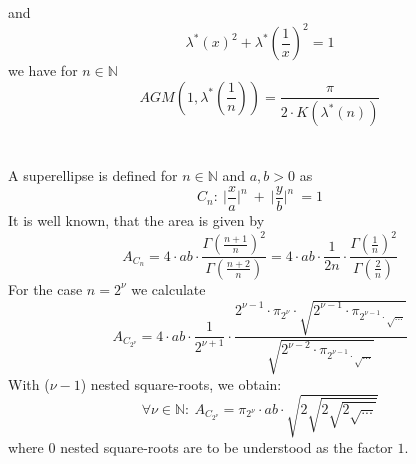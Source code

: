 \documentclass[sn-mathphys]{sn-jnl}%
\theoremstyle{thmstyleone}%
\theoremstyle{thmstyletwo}%
\theoremstyle{thmstylethree}%
\begin{document}
and 
\begin{equation*}
\lambda^{*}(x)^2 + \lambda^{*}(\frac{1}{x})^2 = 1
\end{equation*}
we have for $n \in \mathbb{N}$
\begin{equation}
AGM(1, \lambda^{*}(\frac{1}{n})) = \frac{\pi}{2 \cdot K(\lambda^{*}(n))}
\end{equation}
\\ \\
A superellipse is defined for $n \in \mathbb{N}$ and $a,b > 0$ as
\begin{equation}
C_n : \ \lvert \frac{x}{a} \lvert^{n} \ + \ \lvert \frac{y}{b} \lvert^{n} \ = 1
\end{equation}
It is well known, that the area is given by
\begin{equation}
A_{C_{n}} = 4 \cdot ab \cdot \frac{\Gamma(\frac{n+1}{n})^2}{\Gamma(\frac{n+2}{n})} = 4 \cdot ab \cdot \frac{1}{2n} \cdot \frac{\Gamma(\frac{1}{n})^2}{\Gamma(\frac{2}{n})}
\end{equation}
For the case $n = 2^{\nu}$ we calculate
\begin{equation*}
A_{C_{2^{\nu}}} = 4 \cdot ab \cdot \frac{1}{2^{\nu + 1}} \cdot \frac{2^{\nu - 1} \cdot \pi_{2^{\nu}} \cdot \sqrt{2^{\nu - 1} \cdot \pi_{2^{\nu - 1} \cdot \sqrt{...}}}}{\sqrt{2^{\nu - 2} \cdot \pi_{2^{\nu - 1} \cdot \sqrt{...}}}}
\end{equation*}
With ($\nu - 1$) nested square-roots, we obtain: \\
\begin{equation}
\forall \nu \in \mathbb{N}: \ A_{C_{2^{\nu}}} = \pi_{2^{\nu}} \cdot ab \cdot \sqrt{2 \sqrt{2 \sqrt{2 \sqrt{...}}}}
\end{equation}
where $0$ nested square-roots are to be understood as the factor $1$. \\ \\
\end{document}
